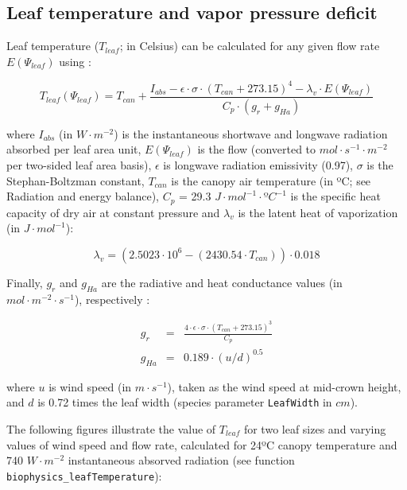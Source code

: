 \documentclass[]{book}
\begin{document}
\subsection{Leaf temperature and vapor pressure
deficit}\label{leaf-temperature-and-vapor-pressure-deficit}

Leaf temperature (\(T_{leaf}\); in Celsius) can be calculated for any
given flow rate \(E(\Psi_{leaf})\) using \citep{Campbell1998}:

\begin{equation}
T_{leaf}(\Psi_{leaf}) = T_{can}+\frac{I_{abs}-\epsilon\cdot\sigma\cdot(T_{can}+273.15)^4-\lambda_v\cdot E(\Psi_{leaf})}{C_p\cdot(g_r+g_{Ha})}
\end{equation}

where \(I_{abs}\) (in \(W \cdot m^{-2}\)) is the instantaneous shortwave
and longwave radiation absorbed per leaf area unit, \(E(\Psi_{leaf})\)
is the flow (converted to \(mol \cdot s^{-1} \cdot m^{-2}\) per
two-sided leaf area basis), \(\epsilon\) is longwave radiation
emissivity (0.97), \(\sigma\) is the Stephan-Boltzman constant,
\(T_{can}\) is the canopy air temperature (in ºC; see Radiation and
energy balance), \(C_p\) = 29.3 \(J \cdot mol^{-1} \cdot ºC^{-1}\) is
the specific heat capacity of dry air at constant pressure and
\(\lambda_v\) is the latent heat of vaporization (in
\(J \cdot mol^{-1}\)):

\begin{equation}
\lambda_v = (2.5023\cdot 10^6-(2430.54\cdot T_{can}))\cdot 0.018
\end{equation}

Finally, \(g_r\) and \(g_{Ha}\) are the radiative and heat conductance
values (in \(mol \cdot m^{-2} \cdot s^{-1}\)), respectively
\citep{Campbell1998}:

\begin{eqnarray}
g_r &=& \frac{4\cdot \epsilon \cdot \sigma \cdot (T_{can}+273.15)^3}{C_p} \\
g_{Ha} &=& 0.189 \cdot (u/d)^{0.5}
\end{eqnarray}

where \(u\) is wind speed (in \(m \cdot s^{-1}\)), taken as the wind
speed at mid-crown height, and \(d\) is 0.72 times the leaf width
(species parameter \texttt{LeafWidth} in \(cm\)).

The following figures illustrate the value of \(T_{leaf}\) for two leaf
sizes and varying values of wind speed and flow rate, calculated for
24ºC canopy temperature and 740 \(W \cdot m^{-2}\) instantaneous
absorved radiation (see function \texttt{biophysics\_leafTemperature}):
\end{document}
